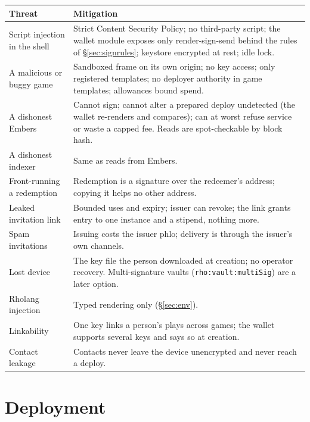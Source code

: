 \documentclass[11pt]{article}
\theoremstyle{definition}
\theoremstyle{remark}
\newcommand{\code}[1]{\texttt{#1}}
\newcommand{\Em}{Embers}
\begin{document}
\begin{longtable}{@{}>{\raggedright\arraybackslash}p{}>{\raggedright\arraybackslash}p{}@{}}
\toprule
Threat & Mitigation\\
\midrule
\endhead
Script injection in the shell & Strict Content Security Policy; no third-party
  script; the wallet module exposes only render-sign-send behind the rules of
  \S\ref{sec:signrules}; keystore encrypted at rest; idle lock.\\
A malicious or buggy game & Sandboxed frame on its own origin; no key access; only
  registered templates; no deployer authority in game templates; allowances bound
  spend.\\
A dishonest \Em{} & Cannot sign; cannot alter a prepared deploy undetected (the wallet
  re-renders and compares); can at worst refuse service or waste a capped fee. Reads
  are spot-checkable by block hash.\\
A dishonest indexer & Same as reads from \Em{}.\\
Front-running a redemption & Redemption is a signature over the redeemer's address;
  copying it helps no other address.\\
Leaked invitation link & Bounded uses and expiry; issuer can revoke; the link grants
  entry to one instance and a stipend, nothing more.\\
Spam invitations & Issuing costs the issuer phlo; delivery is through the issuer's own
  channels.\\
Lost device & The key file the person downloaded at creation; no operator recovery.
  Multi-signature vaults (\code{rho:vault:multiSig}) are a later option.\\
Rholang injection & Typed rendering only (\S\ref{sec:env}).\\
Linkability & One key links a person's plays across games; the wallet supports several
  keys and says so at creation.\\
Contact leakage & Contacts never leave the device unencrypted and never reach a
  deploy.\\
\bottomrule
\end{longtable}

\section{Deployment}\label{sec:deploy}
\end{document}
